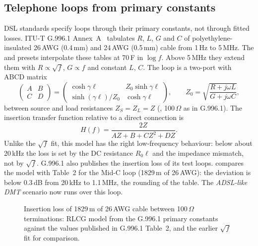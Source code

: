 \subsection{Telephone loops from primary constants}
DSL standards specify loops through their primary constants, not through fitted losses.
ITU-T G.996.1 Annex~A~\cite{g9961} tabulates $R$, $L$, $G$ and $C$ of polyethylene-insulated
26\,AWG (0.4\,mm) and 24\,AWG (0.5\,mm) cable from 1\,Hz to 5\,MHz. The  and
 presets interpolate these tables at 70\,\textdegree F in $\log f$. Above 5\,MHz
they extend them with $R\propto\sqrt f$, $G\propto f$ and constant $L$, $C$. The loop is a
two-port with ABCD matrix
\begin{equation}
  \begin{pmatrix}A&B\\C&D\end{pmatrix}=\begin{pmatrix}\cosh\gamma\ell & Z_0\sinh\gamma\ell\\ \sinh(\gamma\ell)/Z_0 & \cosh\gamma\ell\end{pmatrix},\qquad
  Z_0=\sqrt{\frac{R+j\omega L}{G+j\omega C}},
\end{equation}
between source and load resistances $Z_S=Z_L=Z$ (, 100\,$\Omega$ as in
G.996.1). The insertion transfer function relative to a direct connection is
\begin{equation}
  H(f)=\frac{2Z}{AZ+B+CZ^2+DZ} .
\end{equation}
Unlike the $\sqrt f$ fit, this model has the right low-frequency behaviour: below about 20\,kHz the
loss is set by the DC resistance $R_0\ell$ and the impedance mismatch, not by $\sqrt f$. G.996.1
also publishes the insertion loss of its test loops.  compares the model with
Table~2 for the Mid-C loop (1829\,m of 26\,AWG): the deviation is below 0.3\,dB from 20\,kHz to
1.1\,MHz, the rounding of the table. The \emph{ADSL-like DMT} scenario now runs over this loop.

\begin{figure}[htbp]
\centering
{}
\caption{Insertion loss of 1829\,m of 26\,AWG cable between 100\,$\Omega$ terminations: RLCG model
from the G.996.1 primary constants against the values published in G.996.1 Table~2, and the
earlier $\sqrt f$ fit for comparison.}
\label{fig:pic}
\end{figure}

